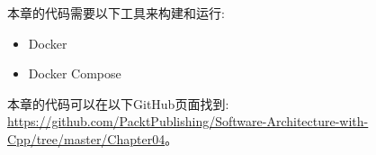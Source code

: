 
本章的代码需要以下工具来构建和运行:

\begin{itemize}
\item Docker
\item Docker Compose
\end{itemize}

本章的代码可以在以下GitHub页面找到: \url{https://github.com/PacktPublishing/Software-Architecture-with-Cpp/tree/master/Chapter04}。